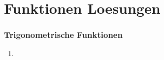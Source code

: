 \chapter{Funktionen Loesungen}

\subsection{Trigonometrische Funktionen}
\begin{enumerate}
	\item
	
	
  	 \begin{enumerate}
  	 

\end{enumerate}
\end{enumerate}
